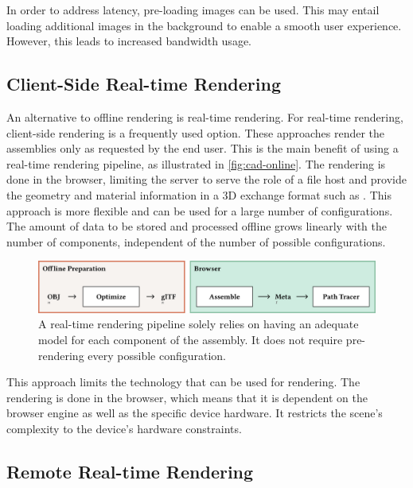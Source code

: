 In order to address latency, pre-loading images can be used. This may entail loading additional images in the background to enable a smooth user experience. However, this leads to increased bandwidth usage.

\subsection*{Client-Side Real-time Rendering}

An alternative to offline rendering is real-time rendering. For real-time rendering, client-side rendering is a frequently  used option. These approaches render the assemblies only as requested by the end user. This is the main benefit of using a real-time rendering pipeline, as illustrated in \autoref{fig:cad-online}. The rendering is done in the browser, limiting the server to serve the role of a file host and provide the geometry and material information in a 3D exchange format such as . This approach is more flexible and can be used for a large number of configurations. The amount of data to be stored and processed offline grows linearly with the number of components, independent of the number of possible configurations.

\begin{figure}[H]
  \includegraphics[width=\columnwidth]{resources/cad-pipeline-online.png}
  \caption{A real-time rendering pipeline solely relies on having an adequate model for each component of the assembly. It does not require pre-rendering every possible configuration.}
  \label{fig:cad-online}
\end{figure}

This approach limits the technology that can be used for rendering. The rendering is done in the browser, which means that it is dependent on the browser engine as well as the specific device hardware. It restricts the scene's complexity to the device's hardware constraints.

\subsection*{Remote Real-time Rendering}

